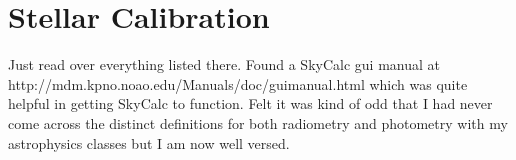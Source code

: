 \documentclass[11pt]{article}
\begin{document}
\section{Stellar Calibration}

Just read over everything listed there. Found a SkyCalc gui manual at http://mdm.kpno.noao.edu/Manuals/doc/guimanual.html which was quite helpful in getting SkyCalc to function. Felt it was kind of odd that I had never come across the distinct definitions for both radiometry and photometry with my astrophysics classes but I am now well versed. 
\end{document}

